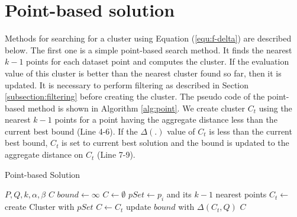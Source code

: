 \documentclass[a4paper,11pt]{report}
\theoremstyle{mytheoremstyle}
\begin{document}
\section{Point-based solution}

Methods for searching for a cluster using Equation (\ref{equ:f-delta}) are described below. The first one is a simple point-based search method. It finds the nearest $k-1$ points for each dataset point and computes the cluster. If the evaluation value of this cluster is better than the nearest cluster found so far, then it is updated. It is necessary to perform filtering as described in Section \ref{subsection:filtering} before creating the cluster. The pseudo code of the point-based method is shown in Algorithm \ref{alg:point}. We create cluster $C_t$ using the nearest $k-1$ points for a point having the aggregate distance less than the current best bound (Line 4-6). If the $\Delta(.)$ value of $C_t$ is less than the current best bound, $C_t$ is set to current best solution and the bound is updated to the aggregate distance on $C_t$ (Line 7-9).

\begin{algorithm}                      
\caption{Point-based Solution}         
\label{alg:point}
\begin{algorithmic}[1]                  
\renewcommand{\algorithmicrequire}{\textbf{Input:}}
\renewcommand{\algorithmicensure}{\textbf{Output:}}
\REQUIRE $P,Q,k,\alpha, \beta$
\ENSURE $C$
\STATE $bound \xleftarrow{} \infty$
\STATE $C \xleftarrow{} \emptyset$
\STATE $pSet \xleftarrow{} p_i$ and its $k-1$ nearest points
\STATE $C_t \xleftarrow{}$ create Cluster with $pSet$
\STATE $C \xleftarrow{} C_t$
\STATE update $bound$ with $\Delta(C_t,Q)$
\ENDIF
\ENDIF
\ENDFOR
\RETURN $C$
\end{algorithmic}
\end{algorithm}
\end{document}
